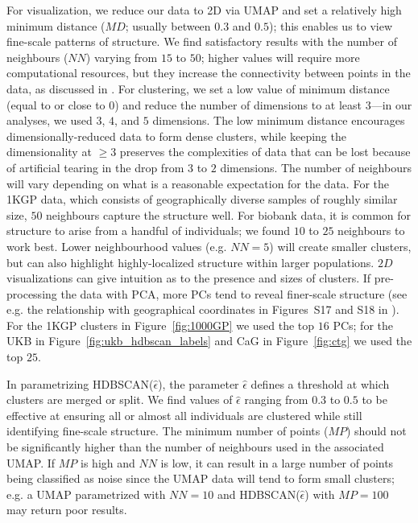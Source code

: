 For visualization, we reduce our data to 2D via UMAP and set a relatively high minimum distance ($MD$; usually between $0.3$ and $0.5$); this enables us to view fine-scale patterns of structure. We find satisfactory results with the number of neighbours ($NN$) varying from $15$ to $50$; higher values will require more computational resources, but they increase the connectivity between points in the data, as discussed in \citep{diaz-papkovich_review_2021}. For clustering, we set a low value of minimum distance (equal to or close to $0$) and reduce the number of dimensions to at least $3$---in our analyses, we used $3$, $4$, and $5$ dimensions. The low minimum distance encourages dimensionally-reduced data to form dense clusters, while keeping the dimensionality at $\geq3$ preserves the complexities of data that can be lost because of artificial tearing in the drop from $3$ to $2$ dimensions. The number of neighbours will vary depending on what is a reasonable expectation for the data. For the 1KGP data, which consists of geographically diverse samples of roughly similar size, $50$ neighbours capture the structure well. For biobank data, it is common for structure to arise from a handful of individuals; we found $10$ to $25$ neighbours to work best. Lower neighbourhood values (e.g. $NN=5$) will create smaller clusters, but can also highlight highly-localized structure within larger populations. $2D$ visualizations can give intuition as to the presence and sizes of clusters. If pre-processing the data with PCA, more PCs tend to reveal finer-scale structure (see e.g. the relationship with geographical coordinates in Figures~S17 and S18 in \citep{diaz-papkovich_umap_2019}). For the 1KGP clusters in Figure~\ref{fig:1000GP} we used the top $16$ PCs; for the UKB in Figure~\ref{fig:ukb_hdbscan_labels} and CaG in Figure~\ref{fig:ctg} we used the top $25$.

In parametrizing HDBSCAN($\hat{\epsilon}$), the parameter $\hat{\epsilon}$ defines a threshold at which clusters are merged or split. We find values of $\hat{\epsilon}$ ranging from $0.3$ to $0.5$ to be effective at ensuring all or almost all individuals are clustered while still identifying fine-scale structure. The minimum number of points ($MP$) should not be significantly higher than the number of neighbours used in the associated UMAP. If $MP$ is high and $NN$ is low, it can result in a large number of points being classified as noise since the UMAP data will tend to form small clusters; e.g. a UMAP parametrized with $NN=10$ and HDBSCAN($\hat{\epsilon}$) with $MP=100$ may return poor results.

